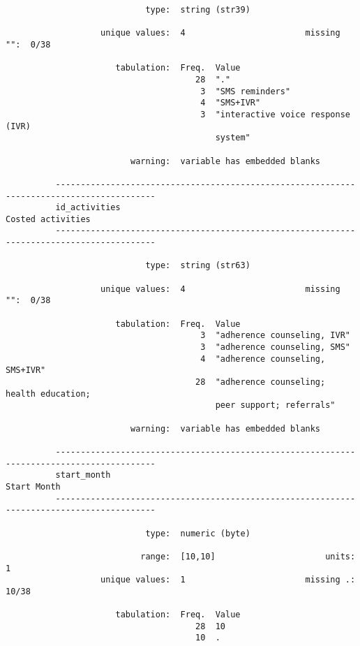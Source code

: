 \documentclass{article}
\begin{document}
\begin{verbatim}
                            type:  string (str39)
          
                   unique values:  4                        missing "":  0/38
          
                      tabulation:  Freq.  Value
                                      28  "."
                                       3  "SMS reminders"
                                       4  "SMS+IVR"
                                       3  "interactive voice response (IVR)
                                          system"
          
                         warning:  variable has embedded blanks
          
          ------------------------------------------------------------------------------------------
          id_activities                                                            Costed activities
          ------------------------------------------------------------------------------------------
          
                            type:  string (str63)
          
                   unique values:  4                        missing "":  0/38
          
                      tabulation:  Freq.  Value
                                       3  "adherence counseling, IVR"
                                       3  "adherence counseling, SMS"
                                       4  "adherence counseling, SMS+IVR"
                                      28  "adherence counseling; health education;
                                          peer support; referrals"
          
                         warning:  variable has embedded blanks
          
          ------------------------------------------------------------------------------------------
          start_month                                                                    Start Month
          ------------------------------------------------------------------------------------------
          
                            type:  numeric (byte)
          
                           range:  [10,10]                      units:  1
                   unique values:  1                        missing .:  10/38
          
                      tabulation:  Freq.  Value
                                      28  10
                                      10  .
          

\end{verbatim}
\end{document}
